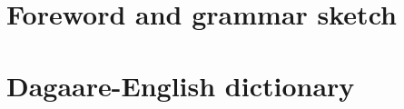 \documentclass[output=book,modfonts,nonflat 
		  ]{langsci/langscibook}
\begin{document}
     

 

\maketitle                
\frontmatter

\tableofcontents
 
 
  
  

\mainmatter         

 
\part{Foreword and grammar sketch}

 
\part{Dagaare-English dictionary}


\end{document}
